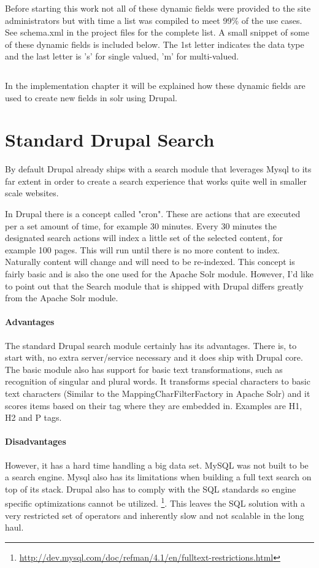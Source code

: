 Before starting this work not all of these dynamic fields were provided to the site administrators but with time a list was compiled to meet 99\% of the use cases.  See schema.xml in the project files for the complete list. A small snippet of some of these dynamic fields is included below. The 1st letter indicates the data type and the last letter is 's' for single valued, 'm' for multi-valued.

\inputminted[fontsize=\scriptsize,linenos]{xml}{./code_examples/schema_dynamicfields.xml}

\noindent In the implementation chapter it will be explained how these dynamic fields are used to create new fields in solr using Drupal.

\section{Standard Drupal Search}
By default Drupal already ships with a search module that leverages Mysql to its far extent in order to create a search experience that works quite well in smaller scale websites.

In Drupal there is a concept called "cron". These are actions that are executed per a set amount of time, for example 30 minutes. Every 30 minutes the designated search actions will index a little set of the selected content, for example 100 pages. This will run until there is no more content to index. Naturally content will change and will need to be re-indexed. This concept is fairly basic and is also the one used for the Apache Solr module. 
However, I'd like to point out that the Search module that is shipped with Drupal differs greatly from the Apache Solr module. 

\paragraph{Advantages} The standard Drupal search module certainly has its advantages. There is, to start with, no extra server/service necessary and it does ship with Drupal core. The basic module also has support for basic text transformations, such as recognition of singular and plural words. It transforms special characters to basic text characters (Similar to the MappingCharFilterFactory in Apache Solr) and it scores items based on their tag where they are embedded in. Examples are H1, H2 and P tags.

\paragraph{Disadvantages} However, it has a hard time handling a big data set. MySQL was not built to be a search engine. Mysql also has its limitations when building a full text search on top of its stack. Drupal also has to comply with the SQL standards so engine specific optimizations cannot be utilized. \footnote{\url{http://dev.mysql.com/doc/refman/4.1/en/fulltext-restrictions.html}}. This leaves the SQL solution with a very restricted set of operators and inherently slow and not scalable in the long haul. 

